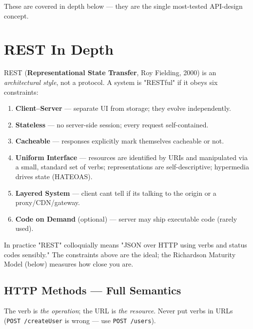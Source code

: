 \documentclass[11pt]{article}
\providecommand{\tightlist}{\setlength{\itemsep}{1pt}\setlength{\parskip}{0pt}}
\begin{document}
These are covered in depth below --- they are the single most-tested API-design concept.

\section{REST In Depth}\label{rest-in-depth}

REST (\textbf{Representational State Transfer}, Roy Fielding, 2000) is an \emph{architectural style}, not a protocol. A system is "RESTful" if it obeys six constraints:

\begin{enumerate}
\def\labelenumi{\arabic{enumi}.}
\tightlist
\item
  \textbf{Client--Server} --- separate UI from storage; they evolve independently.
\item
  \textbf{Stateless} --- no server-side session; every request self-contained.
\item
  \textbf{Cacheable} --- responses explicitly mark themselves cacheable or not.
\item
  \textbf{Uniform Interface} --- resources are identified by URIs and manipulated via a small, standard set of verbs; representations are self-descriptive; hypermedia drives state (HATEOAS).
\item
  \textbf{Layered System} --- client can\textquotesingle t tell if it\textquotesingle s talking to the origin or a proxy/CDN/gateway.
\item
  \textbf{Code on Demand} (optional) --- server may ship executable code (rarely used).
\end{enumerate}

In practice "REST" colloquially means "JSON over HTTP using verbs and status codes sensibly." The constraints above are the ideal; the Richardson Maturity Model (below) measures how close you are.

\subsection{HTTP Methods --- Full Semantics}\label{http-methods--full-semantics}

The verb is \emph{the operation}; the URL is \emph{the resource}. Never put verbs in URLs (\texttt{POST\ /createUser} is wrong --- use \texttt{POST\ /users}).
\end{document}
